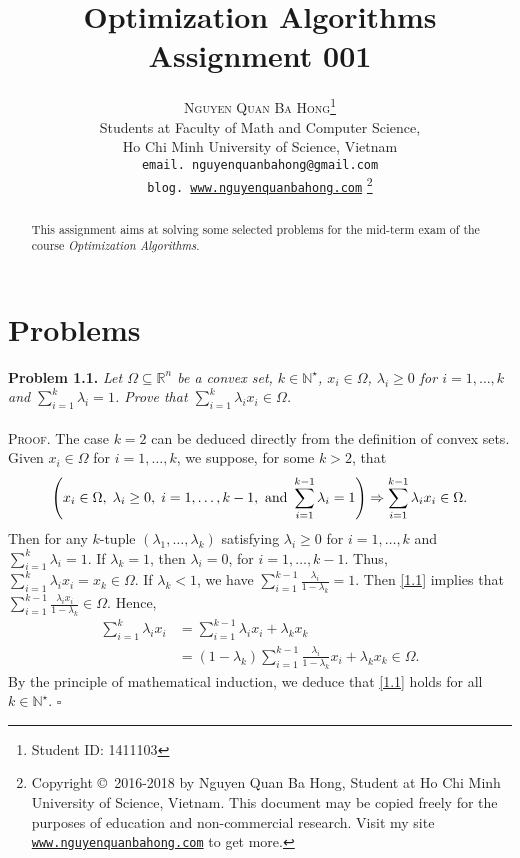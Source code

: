 \documentclass[a4paper]{article}
\title{\huge Optimization Algorithms Assignment 001}
\author{\textsc{Nguyen Quan Ba Hong}\footnote{Student ID: 1411103}\\
{\small Students at Faculty of Math and Computer Science,}\\ 
{\small Ho Chi Minh University of Science, Vietnam} \\
{\small \texttt{email. nguyenquanbahong@gmail.com}}\\
{\small \texttt{blog. \url{www.nguyenquanbahong.com}} 
\footnote{Copyright \copyright\ 2016-2018 by Nguyen Quan Ba Hong, Student at Ho Chi Minh University of Science, Vietnam. This document may be copied freely for the purposes of education and non-commercial research. Visit my site \texttt{\url{www.nguyenquanbahong.com}} to get more.}}}
\numberwithin{equation}{section}
\begin{document}
\maketitle
\begin{abstract}
This assignment aims at solving some selected problems for the mid-term exam of the course \textit{Optimization Algorithms}.
\end{abstract}
\newpage
\tableofcontents
\newpage
\section{Problems}
\textbf{Problem 1.1.} \textit{Let $\Omega  \subseteq {\mathbb{R}^n}$ be a convex set, $k\in \mathbb{N}^\star$, $x_i \in \Omega$, $\lambda _i \ge  0$ for $i=1,\ldots,k$ and $\sum\nolimits_{i = 1}^k {{\lambda _i}}  = 1$. Prove that $\sum\nolimits_{i = 1}^k {{\lambda _i}{x_i}}  \in \Omega $.}\\
\\
\textsc{Proof.} The case $k=2$ can be deduced directly from the definition of convex sets. Given $x_i \in \Omega$ for $i=1,\ldots,k$, we suppose, for some $k>2$, that 
\begin{align}
\label{1.1}
\left( {{x_i} \in \Omega , \hspace{0.1cm}{\lambda _i} \ge 0,\hspace{0.1cm}i = 1, \ldots ,k - 1,\mbox{ and } \sum\limits_{i = 1}^{k - 1} {{\lambda _i}}  = 1} \right) \Rightarrow \sum\limits_{i = 1}^{k - 1} {{\lambda _i}{x_i}}  \in \Omega .
\end{align}
Then for any $k$-tuple $\left(\lambda _1,\ldots,\lambda _k \right)$ satisfying $\lambda _i\ge 0$ for $i=1,\ldots,k$ and $\sum\nolimits_{i = 1}^k {{\lambda _i}}  = 1$. If $\lambda _k =1$, then $\lambda _i=0$, for $i=1,\ldots,k-1$. Thus, $\sum\nolimits_{i = 1}^k {{\lambda _i}{x_i}}  = {x_k} \in \Omega $. If $\lambda _k <1$, we have $\sum\nolimits_{i = 1}^{k - 1} {\frac{{{\lambda _i}}}{{1 - {\lambda _k}}}}  = 1$. Then \eqref{1.1} implies that $\sum\nolimits_{i = 1}^{k - 1} {\frac{{{\lambda _i}{x_i}}}{{1 - {\lambda _k}}}}  \in \Omega $. Hence, 
\begin{align}
\sum\limits_{i = 1}^k {{\lambda _i}{x_i}}  &= \sum\limits_{i = 1}^{k - 1} {{\lambda _i}{x_i}}  + {\lambda _k}{x_k}\\
 &= \left( {1 - {\lambda _k}} \right)\sum\limits_{i = 1}^{k - 1} {\frac{{{\lambda _i}}}{{1 - {\lambda _k}}}{x_i}}  + {\lambda _k}{x_k} \in \Omega .
\end{align}
By the principle of mathematical induction, we deduce that \eqref{1.1} holds for all $k \in \mathbb{N}^\star$. \hfill $\square$\\
\end{document}
